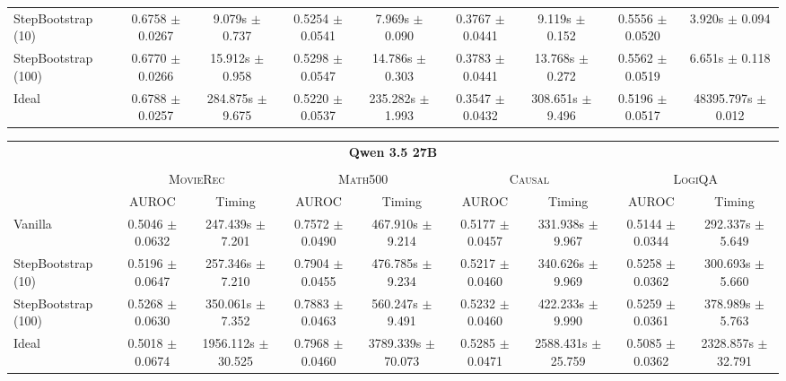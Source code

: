 \begin{table}[t]
\begin{tabular}{lcccccccc}
        StepBootstrap (10) & 0.6758 $\pm$ 0.0267 & 9.079s $\pm$ 0.737 & 0.5254 $\pm$ 0.0541 & 7.969s $\pm$ 0.090 & 0.3767 $\pm$ 0.0441 & 9.119s $\pm$ 0.152 & 0.5556 $\pm$ 0.0520 & 3.920s $\pm$ 0.094 \\
        StepBootstrap (100) & 0.6770 $\pm$ 0.0266 & 15.912s $\pm$ 0.958 & 0.5298 $\pm$ 0.0547 & 14.786s $\pm$ 0.303 & 0.3783 $\pm$ 0.0441 & 13.768s $\pm$ 0.272 & 0.5562 $\pm$ 0.0519 & 6.651s $\pm$ 0.118 \\
        Ideal & 0.6788 $\pm$ 0.0257 & 284.875s $\pm$ 9.675 & 0.5220 $\pm$ 0.0537 & 235.282s $\pm$ 1.993 & 0.3547 $\pm$ 0.0432 & 308.651s $\pm$ 9.496 & 0.5196 $\pm$ 0.0517 & 48395.797s $\pm$ 0.012 \\
        \bottomrule
    \end{tabular}


    \vspace{10pt}
    \begin{tabular}{lcccccccc}
        \toprule
        \multicolumn{9}{c}{\textbf{Qwen 3.5 27B}} \\
        \vspace{-5pt}\\
        \multirow{2}{*}{} & \multicolumn{2}{c}{\textsc{MovieRec}} & \multicolumn{2}{c}{\textsc{Math500}} & \multicolumn{2}{c}{\textsc{Causal}} & \multicolumn{2}{c}{\textsc{LogiQA}} \\
        \cmidrule(lr){2-3} \cmidrule(lr){4-5} \cmidrule(lr){6-7} \cmidrule(lr){8-9}
          & AUROC & Timing & AUROC & Timing & AUROC & Timing & AUROC & Timing \\
        \cmidrule(lr){2-3} \cmidrule(lr){4-5} \cmidrule(lr){6-7} \cmidrule(lr){8-9}
        Vanilla & 0.5046 $\pm$ 0.0632 & 247.439s $\pm$ 7.201 & 0.7572 $\pm$ 0.0490 & 467.910s $\pm$ 9.214 & 0.5177 $\pm$ 0.0457 & 331.938s $\pm$ 9.967 & 0.5144 $\pm$ 0.0344 & 292.337s $\pm$ 5.649 \\
        StepBootstrap (10) & 0.5196 $\pm$ 0.0647 & 257.346s $\pm$ 7.210 & 0.7904 $\pm$ 0.0455 & 476.785s $\pm$ 9.234 & 0.5217 $\pm$ 0.0460 & 340.626s $\pm$ 9.969 & 0.5258 $\pm$ 0.0362 & 300.693s $\pm$ 5.660 \\
        StepBootstrap (100) & 0.5268 $\pm$ 0.0630 & 350.061s $\pm$ 7.352 & 0.7883 $\pm$ 0.0463 & 560.247s $\pm$ 9.491 & 0.5232 $\pm$ 0.0460 & 422.233s $\pm$ 9.990 & 0.5259 $\pm$ 0.0361 & 378.989s $\pm$ 5.763 \\
        Ideal & 0.5018 $\pm$ 0.0674 & 1956.112s $\pm$ 30.525 & 0.7968 $\pm$ 0.0460 & 3789.339s $\pm$ 70.073 & 0.5285 $\pm$ 0.0471 & 2588.431s $\pm$ 25.759 & 0.5085 $\pm$ 0.0362 & 2328.857s $\pm$ 32.791 \\

\end{tabular}
\end{table}
